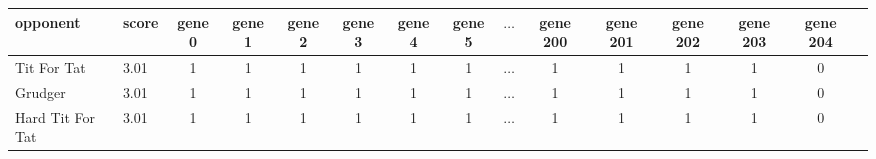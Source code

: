 \begin{tabular}{llccccccccccccc}
\toprule
opponent &  score &  gene 0 &  gene 1 &  gene 2 &  gene 3 &  gene 4 &  gene 5 & \(\dots\) &  gene 200 &  gene 201 &  gene 202 &  gene 203 &  gene 204 \\
\midrule
     Tit For Tat &   3.01 &       1 &       1 &       1 &       1 &       1 &       1 & \(\dots\) &      1 &         1 &         1 &         1 &         0 \\
         Grudger &   3.01 &       1 &       1 &       1 &       1 &       1 &       1 & \(\dots\) &      1 &         1 &         1 &         1 &         0 \\
Hard Tit For Tat &   3.01 &       1 &       1 &       1 &       1 &       1 &       1 & \(\dots\) &      1 &         1 &         1 &         1 &         0 \\
\bottomrule
\end{tabular}
